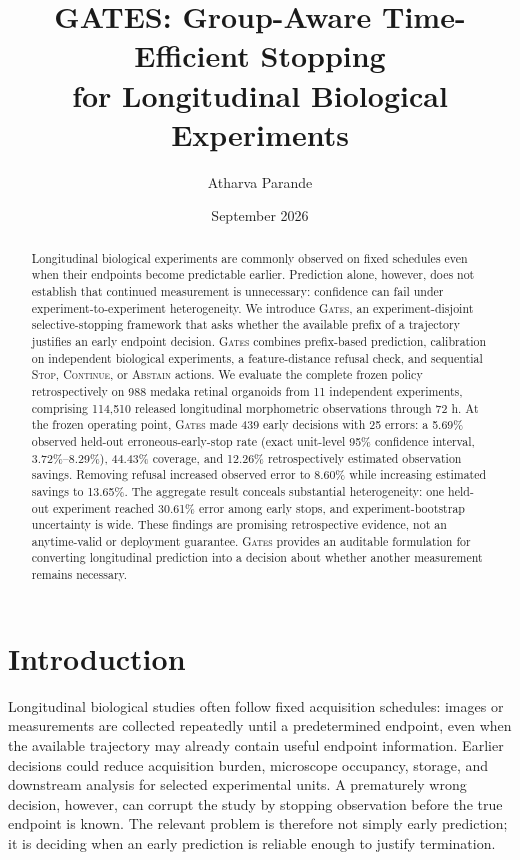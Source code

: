 \documentclass[11pt,twocolumn]{article}
\title{\vspace{-1.4em}\textbf{GATES: Group-Aware Time-Efficient Stopping\\for Longitudinal Biological Experiments}}
\author{Atharva Parande}
\date{September 2026}
\newcommand{\method}{\textsc{Gates}\xspace}
\newcommand{\stopstate}{\textsc{Stop}\xspace}
\newcommand{\continuestate}{\textsc{Continue}\xspace}
\newcommand{\abstainstate}{\textsc{Abstain}\xspace}
\newcommand{\pct}[1]{#1\%}
\begin{document}
\maketitle
\thispagestyle{fancy}

\begin{abstract}
Longitudinal biological experiments are commonly observed on fixed schedules even when their
endpoints become predictable earlier. Prediction alone, however, does not establish that continued
measurement is unnecessary: confidence can fail under experiment-to-experiment heterogeneity.
We introduce \method, an experiment-disjoint selective-stopping framework that asks whether the
available prefix of a trajectory justifies an early endpoint decision. \method combines
prefix-based prediction, calibration on independent biological experiments, a feature-distance
refusal check, and sequential \stopstate, \continuestate, or \abstainstate actions. We evaluate the
complete frozen policy retrospectively on 988 medaka retinal organoids from 11 independent
experiments, comprising 114,510 released longitudinal morphometric observations through 72 h. At
the frozen operating point, \method made 439 early decisions with 25 errors: a \pct{5.69} observed
held-out erroneous-early-stop rate (exact unit-level 95\% confidence interval,
\pct{3.72}--\pct{8.29}), \pct{44.43} coverage, and \pct{12.26} retrospectively estimated
observation savings. Removing refusal increased observed error to \pct{8.60} while increasing
estimated savings to \pct{13.65}. The aggregate result conceals substantial heterogeneity: one
held-out experiment reached \pct{30.61} error among early stops, and experiment-bootstrap
uncertainty is wide. These findings are promising retrospective evidence, not an anytime-valid or
deployment guarantee. \method provides an auditable formulation for converting longitudinal
prediction into a decision about whether another measurement remains necessary.
\end{abstract}

\section{Introduction}

Longitudinal biological studies often follow fixed acquisition schedules: images or measurements
are collected repeatedly until a predetermined endpoint, even when the available trajectory may
already contain useful endpoint information. Earlier decisions could reduce acquisition burden,
microscope occupancy, storage, and downstream analysis for selected experimental units. A
prematurely wrong decision, however, can corrupt the study by stopping observation before the true
endpoint is known. The relevant problem is therefore not simply early prediction; it is deciding
when an early prediction is reliable enough to justify termination.
\end{document}
